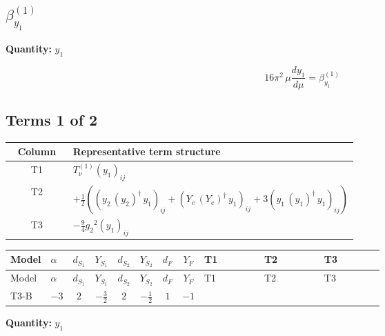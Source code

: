 \documentclass[8pt]{article}
\begin{document}
\begin{landscape}
\section*{$\beta_{y_1}^{(1)}$}
\noindent\textbf{Quantity: }$y_1$\par\smallskip
\[16\pi^2\,\mu\frac{d y_1}{d\mu}=\beta_{y_1}^{(1)}\]
\subsection*{Terms 1 of 2}
\begin{center}
\begin{tabular}{@{}c >{\raggedright\arraybackslash}p{0.82\linewidth}@{}}
\toprule
Column & Representative term structure \\
\midrule
T1 & \(\displaystyle T_{\nu}^{(1)} \left({y_1}\right)_{ij}\) \\
\midrule
T2 & \(\displaystyle +\frac{1}{2} (\left({y_2}\,\left({y_2}\right)^{\dagger}\,{y_1}\right)_{ij}+\left({Y_e}\,\left({Y_e}\right)^{\dagger}\,{y_1}\right)_{ij}+3 \left({y_1}\,\left({y_1}\right)^{\dagger}\,{y_1}\right)_{ij})\) \\
\midrule
T3 & \(\displaystyle -\frac{9}{4} {g_2}^2 \left({y_1}\right)_{ij}\) \\
\midrule
\bottomrule
\end{tabular}
\end{center}
\smallskip
\tiny
\begin{longtable}{@{}llcccccc >{\raggedright\arraybackslash}p{0.21\linewidth} >{\raggedright\arraybackslash}p{0.21\linewidth} >{\raggedright\arraybackslash}p{0.21\linewidth}@{}}
\toprule
Model & $\alpha$ & $d_{S_1}$ & $Y_{S_1}$ & $d_{S_2}$ & $Y_{S_2}$ & $d_F$ & $Y_F$ & T1 & T2 & T3 \\
\midrule
\endfirsthead
\toprule
Model & $\alpha$ & $d_{S_1}$ & $Y_{S_1}$ & $d_{S_2}$ & $Y_{S_2}$ & $d_F$ & $Y_F$ & T1 & T2 & T3 \\
\midrule
\endhead
T3-B & $-3$ & $2$ & $-\frac{3}{2}$ & $2$ & $-\frac{1}{2}$ & $1$ & $-1$ & \scriptsize\adjustbox{max width=\linewidth}{$\begin{gathered} T_{\nu}^{(1)} \left({y_1}\right)_{ij}\end{gathered}$} & \scriptsize\adjustbox{max width=\linewidth}{$\begin{gathered} +\frac{1}{2} (\left({y_2}\,\left({y_2}\right)^{\dagger}\,{y_1}\right)_{ij}+\left({Y_e}\,\left({Y_e}\right)^{\dagger}\,{y_1}\right)_{ij}+3 \left({y_1}\,\left({y_1}\right)^{\dagger}\,{y_1}\right)_{ij})\end{gathered}$} & \scriptsize\adjustbox{max width=\linewidth}{$\begin{gathered} -\frac{9}{4} {g_2}^2 \left({y_1}\right)_{ij}\end{gathered}$} \\
\midrule
\bottomrule
\end{longtable}
\clearpage
\noindent\textbf{Quantity: }$y_1$\par\smallskip

\end{landscape}
\end{document}
